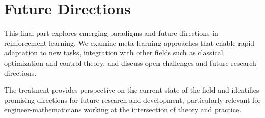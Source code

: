 \part{Future Directions}

This final part explores emerging paradigms and future directions in reinforcement learning. We examine meta-learning approaches that enable rapid adaptation to new tasks, integration with other fields such as classical optimization and control theory, and discuss open challenges and future research directions.

The treatment provides perspective on the current state of the field and identifies promising directions for future research and development, particularly relevant for engineer-mathematicians working at the intersection of theory and practice.


